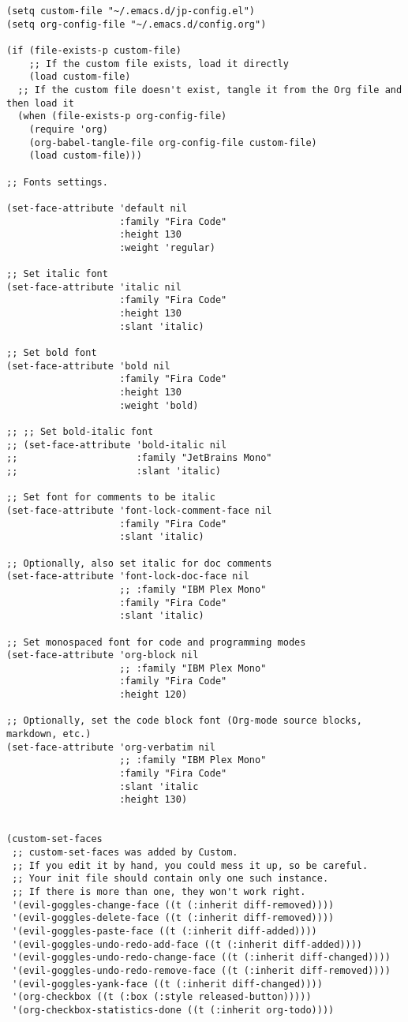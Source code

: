\documentclass[11pt]{article}
\begin{document}
\begin{verbatim}
(setq custom-file "~/.emacs.d/jp-config.el")
(setq org-config-file "~/.emacs.d/config.org")

(if (file-exists-p custom-file)
    ;; If the custom file exists, load it directly
    (load custom-file)
  ;; If the custom file doesn't exist, tangle it from the Org file and then load it
  (when (file-exists-p org-config-file)
    (require 'org)
    (org-babel-tangle-file org-config-file custom-file)
    (load custom-file)))

;; Fonts settings.

(set-face-attribute 'default nil
                    :family "Fira Code"
                    :height 130
                    :weight 'regular)

;; Set italic font
(set-face-attribute 'italic nil
                    :family "Fira Code"
                    :height 130
                    :slant 'italic)

;; Set bold font
(set-face-attribute 'bold nil
                    :family "Fira Code"
                    :height 130
                    :weight 'bold)

;; ;; Set bold-italic font
;; (set-face-attribute 'bold-italic nil
;;                     :family "JetBrains Mono"
;;                     :slant 'italic)

;; Set font for comments to be italic
(set-face-attribute 'font-lock-comment-face nil
                    :family "Fira Code"
                    :slant 'italic)

;; Optionally, also set italic for doc comments
(set-face-attribute 'font-lock-doc-face nil
                    ;; :family "IBM Plex Mono"
                    :family "Fira Code"
                    :slant 'italic)

;; Set monospaced font for code and programming modes
(set-face-attribute 'org-block nil
                    ;; :family "IBM Plex Mono"
                    :family "Fira Code"
                    :height 120)

;; Optionally, set the code block font (Org-mode source blocks, markdown, etc.)
(set-face-attribute 'org-verbatim nil
                    ;; :family "IBM Plex Mono"
                    :family "Fira Code"
                    :slant 'italic
                    :height 130)


(custom-set-faces
 ;; custom-set-faces was added by Custom.
 ;; If you edit it by hand, you could mess it up, so be careful.
 ;; Your init file should contain only one such instance.
 ;; If there is more than one, they won't work right.
 '(evil-goggles-change-face ((t (:inherit diff-removed))))
 '(evil-goggles-delete-face ((t (:inherit diff-removed))))
 '(evil-goggles-paste-face ((t (:inherit diff-added))))
 '(evil-goggles-undo-redo-add-face ((t (:inherit diff-added))))
 '(evil-goggles-undo-redo-change-face ((t (:inherit diff-changed))))
 '(evil-goggles-undo-redo-remove-face ((t (:inherit diff-removed))))
 '(evil-goggles-yank-face ((t (:inherit diff-changed))))
 '(org-checkbox ((t (:box (:style released-button)))))
 '(org-checkbox-statistics-done ((t (:inherit org-todo))))


\end{verbatim}
\end{document}
